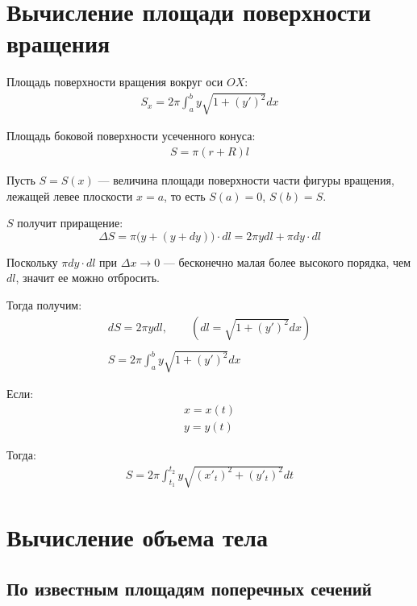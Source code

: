 \documentclass[a4paper,12pt,oneside]{extbook}
\theoremstyle{numbered}
\theoremstyle{unnumbered}
\theoremstyle{named}
\theoremstyle{unnumbered}
\theoremstyle{named}
\theoremstyle{named}
\theoremstyle{named}
\begin{document}
\section{Вычисление площади поверхности вращения}%
\label{sec:Вычисление площади поверхности вращения}

Площадь поверхности вращения вокруг оси \(OX\):
\begin{gather*}
    S_x = 2\pi \int_a^b y\sqrt{1 + (y')^2}dx
\end{gather*}

Площадь боковой поверхности усеченного конуса:
\begin{gather*}
    S = \pi(r + R)l
\end{gather*}

Пусть \(S = S(x)\) — величина площади поверхности части фигуры вращения, лежащей левее плоскости \(x = a\), то есть \(S(a) = 0\), \(S(b) = S\).

\(S\) получит приращение:
\[
    \Delta S = \pi \Big(y + (y + dy)\Big) \cdot dl = 2\pi ydl + \pi dy \cdot dl
\]

Поскольку \(\pi dy \cdot dl\) при \(\Delta x \to 0\) — бесконечно малая более высокого порядка, чем \(dl\), значит ее можно отбросить.

Тогда получим:
\begin{gather*}
    dS = 2\pi ydl, \qquad (dl = \sqrt{1 + (y')^2}dx) \\ \\
    S = 2\pi \int_a^b y\sqrt{1 + (y')^2}dx
\end{gather*}

Если:
\begin{gather*}
    x = x(t) \\
    y = y(t)
\end{gather*}

Тогда:
\begin{gather*}
    S = 2\pi \int_{t_1}^{t_2} y\sqrt{(x'_t)^2 + (y'_t)^2}dt
\end{gather*}

\section{Вычисление объема тела}%
\label{sec:Вычисление объема тела}

\subsection{По известным площадям поперечных сечений}%
\label{sub:По известным площадям поперечных сечений}
\end{document}
